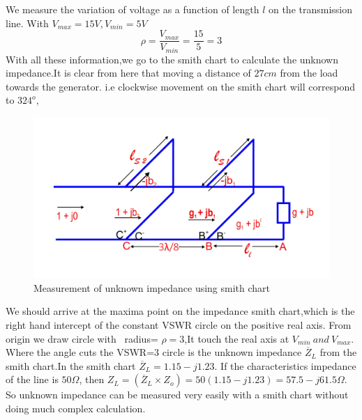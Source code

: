 \begin{example}
We measure the variation of voltage as a function of length $ l $ on the transmission line. With $V_{max}=15V,V_{min}=5V$
\begin{equation*}
\rho=\frac{V_{max}}{V_{min}}=\frac{15}{5}=3
\end{equation*}
With all these information,we go to the smith chart to calculate the unknown impedance.It is clear from here that moving a distance of $27cm$ from the load towards the generator. i.e clockwise  movement on the smith chart will correspond to $324^o$,
\begin{figure}[h]
\centering
\includegraphics[width=1\linewidth]{./graphics/fig12}
\caption{Measurement of unknown impedance using smith chart}
\end{figure}

We should arrive at the maxima point on the impedance smith chart,which is the right hand intercept of the constant VSWR circle on the positive real axis. From origin we draw circle with \ radius= $\rho =3$,It touch the real axis at $V_{min}\ and\ V_{max}$. Where the angle cuts the VSWR=3 circle is the unknown impedance $\overline{Z}_L$ from the smith chart.In the smith chart $\overline{Z}_L=1.15-j1.23$. If the characteristics impedance of the line is $50\Omega$, then $Z_{L}= (\overline{Z}_L\times Z_o)=50(1.15-j1.23)= 57.5-j61.5 \Omega$. So unknown impedance can be measured very easily with a smith chart without doing much complex calculation.
\end{example}

